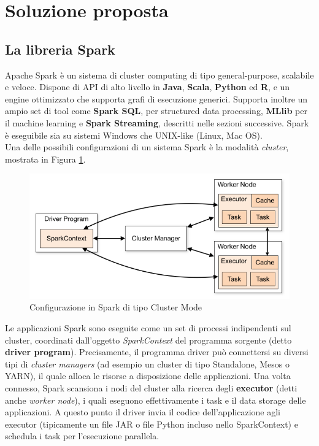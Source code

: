 \documentclass[11pt]{article}
\begin{document}
\section{Soluzione proposta}

\subsection{La libreria Spark}

Apache Spark è un sistema di cluster computing di tipo general-purpose, scalabile e veloce. Dispone di API di alto livello in \textbf{Java}, \textbf{Scala},\textbf{ Python} ed \textbf{R}, e un engine ottimizzato che supporta grafi di esecuzione generici. Supporta inoltre un ampio set di tool come \textbf{Spark SQL}, per structured data processing, \textbf{MLlib} per il machine learning e \textbf{Spark Streaming}, descritti nelle sezioni successive. Spark è eseguibile sia su sistemi Windows che UNIX-like (Linux, Mac OS). \\

Una delle possibili configurazioni di un sistema Spark è la modalità \textit{cluster}, mostrata in Figura \ref{spark-cluster}. 

\begin{figure}[H]
	\centering
	\includegraphics[scale=0.50]{images/cluster-overview.png}
	\caption{Configurazione in Spark di tipo Cluster Mode}
	\label{spark-cluster}
\end{figure}

Le applicazioni Spark sono eseguite come un set di processi indipendenti sul cluster, coordinati dall'oggetto \textit{SparkContext} del programma sorgente (detto \textbf{driver program}). Precisamente, il programma driver può connettersi su diversi tipi di \textit{cluster managers} (ad esempio un cluster di tipo Standalone, Mesos o YARN), il quale alloca le risorse a disposizione delle applicazioni. Una volta connesso, Spark scansiona i nodi del cluster alla ricerca degli \textbf{executor} (detti anche \textit{worker node}), i quali eseguono effettivamente i task e il data storage delle applicazioni. A questo punto il driver invia il codice dell'applicazione agli executor (tipicamente un file JAR o file Python incluso nello SparkContext) e schedula i task per l'esecuzione parallela. 
\end{document}
